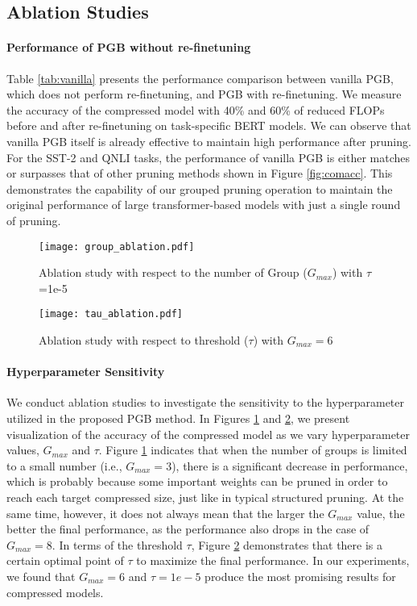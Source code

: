 \subsection{Ablation Studies}\label{app:ablation}
\paragraph{Performance of PGB without re-finetuning}

Table \ref{tab:vanilla} presents the performance comparison between vanilla PGB, which does not perform re-finetuning, and PGB with re-finetuning. We measure the accuracy of the compressed model with 40\% and 60\%  of reduced FLOPs before and after re-finetuning on task-specific BERT models. We can observe that vanilla PGB itself is already effective to maintain high performance after pruning. For the SST-2 and QNLI tasks, the performance of vanilla PGB is either matches or surpasses that of other pruning methods shown in Figure \ref{fig:comacc}. This demonstrates the capability of our grouped pruning operation to maintain the original performance of large transformer-based models with just a single round of pruning.

\begin{figure}[t!]
    \centering
    {\texttt{[image: group\_ablation.pdf]}}
  
    \caption{Ablation study with respect to the number of Group ($G_{max}$) with $\tau$=1e-5}
    \label{fig:group_ablation}
\end{figure}

\begin{figure}[t!]
    \centering
    {\texttt{[image: tau\_ablation.pdf]}}

    \caption{Ablation study with respect to threshold ($\tau$) with $G_{max} = 6$}
    \label{fig:tau_ablation}
\end{figure}

\paragraph{Hyperparameter Sensitivity}
We conduct ablation studies to investigate the sensitivity to the hyperparameter utilized in the proposed PGB method. In Figures \ref{fig:group_ablation} and \ref{fig:tau_ablation}, we present visualization of the accuracy of the compressed model as we vary hyperparameter values, $G_{max}$ and $\tau$. 
Figure \ref{fig:group_ablation} indicates that when the number of groups is limited to a small number (i.e., ${G}_{max}=3$), there is a significant decrease in performance, which is probably because some important weights can be pruned in order to reach each target compressed size, just like in typical structured pruning. At the same time, however, it does not always mean that the larger the $G_{max}$ value, the better the final performance, as the performance also drops in the case of ${G}_{max}=8$. In terms of the threshold $\tau$, Figure \ref{fig:tau_ablation} demonstrates that there is a certain optimal point of $\tau$ to maximize the final performance. In our experiments, we found that $G_{max}=6$ and $\tau=1e-5$ produce the most promising results for compressed models.    


